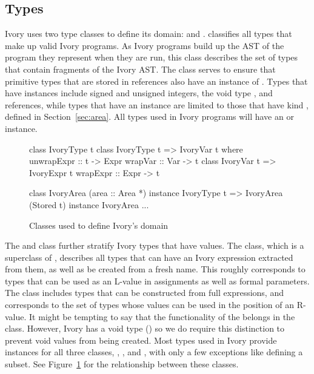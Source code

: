 \subsection{Types}
\label{sec:types}

Ivory uses two type classes to define its domain:  and
.   classifies all types that make up valid Ivory
programs.  As Ivory programs build up the AST of the program they represent when
they are run, this class describes the set of types that contain fragments of
the Ivory AST.  The  class serves to ensure that primitive types
that are stored in references also have an instance of .  Types
that have  instances include signed and unsigned integers, the
void type \cd{()}, and references, while types that have an 
instance are limited to those that have kind , defined in
Section~\ref{sec:area}.  All types used in Ivory programs will have an
 or  instance.

\begin{figure}[t]
\begin{code}
class IvoryType t
class IvoryType t => IvoryVar t where
  unwrapExpr :: t -> Expr
  wrapVar    :: Var -> t
class IvoryVar t => IvoryExpr t
  wrapExpr   :: Expr -> t

class    IvoryArea (area :: Area *)
instance IvoryType t => IvoryArea (Stored t)
instance IvoryArea ...
\end{code}
\caption{Classes used to define Ivory's domain}
\label{fig:types}
\end{figure}

The  and  class further stratify Ivory types that
have values.  The  class, which is a superclass of ,
describes all types that can have an Ivory expression extracted from them, as
well as be created from a fresh name.  This roughly corresponds to types that
can be used as an L-value in assignments as well as formal parameters.  The
 class includes types that can be constructed from full
expressions, and corresponds to the set of types whose values can be used in the
position of an R-value.  It might be tempting to say that the functionality of
the  belongs in the  class. However, Ivory has a void
type (\cd{()}) so we do require this distinction to prevent void values from
being created.  Most types used in Ivory provide instances for all three
classes, , , and , with only a few
exceptions like \cd{()} defining a subset.  See Figure~\ref{fig:types} for the
relationship between these classes.



